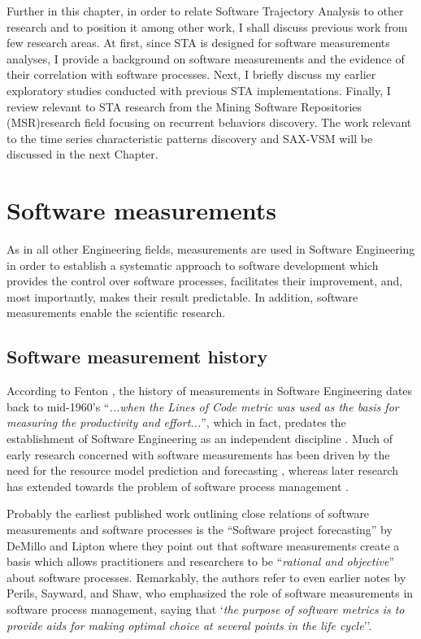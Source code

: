 Further in this chapter, in order to relate Software Trajectory Analysis to other research and to position 
it among other work, I shall discuss previous work from few research areas.
At first, since STA is designed for software measurements analyses, I provide a background on software 
measurements and the evidence of their correlation with software processes. 
Next, I briefly discuss my earlier exploratory studies conducted with previous STA implementations. 
Finally, I review relevant to STA research from the Mining Software Repositories (MSR)research field 
focusing on recurrent behaviors discovery.
The work relevant to the time series characteristic patterns discovery and SAX-VSM will be discussed 
in the next Chapter.

\section{Software measurements}
As in all other Engineering fields, measurements are used in Software Engineering in order to establish a 
systematic approach to software development which provides the control over software processes, facilitates
their improvement, and, most importantly, makes their result predictable. 
In addition, software measurements enable the scientific research.

\subsection{Software measurement history}
According to Fenton \cite{citeulike:1525462}, the history of measurements in Software Engineering dates 
back to mid-1960's  ``\textit{...when the Lines of Code metric was used as the basis for measuring the 
productivity and effort...}'', which in fact, predates the establishment of Software Engineering as an 
independent discipline \cite{naur_crisis_68}. 
Much of early research concerned with software measurements has been driven by the need for the resource model 
prediction and forecasting \cite{citeulike:1525462}, whereas later research has extended towards the problem 
of software process management \cite{citeulike:13158802}.

Probably the earliest published work outlining close relations of software measurements and software 
processes is the ``Software project forecasting'' by DeMillo and Lipton \cite{demillo1980software} where they 
point out that software measurements create a basis which allows practitioners and researchers to be 
``\textit{rational and objective}'' about software processes. 
Remarkably, the authors refer to even earlier notes by Perils, Sayward, and Shaw, who emphasized the role of software 
measurements in software process management, saying that `\textit{the purpose of software metrics is 
to provide aids for making optimal choice at several points in the life cycle}''.

